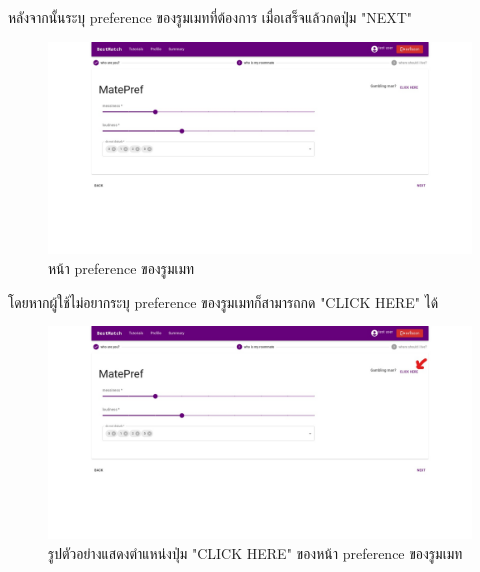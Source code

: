 หลังจากนั้นระบุ preference ของรูมเมทที่ต้องการ เมื่อเสร็จแล้วกดปุ่ม "NEXT"
\begin{figure}[h]
  \begin{center}
    \includegraphics[width=\linewidth]{photo/web/student/mate-def.jpeg}
  \end{center}
  \caption{หน้า preference ของรูมเมท}
\end{figure}
%
\newline
โดยหากผู้ใช้ไม่อยากระบุ preference ของรูมเมทก็สามารถกด "CLICK HERE" ได้
\begin{figure}[h]
  \begin{center}
    \includegraphics[width=\linewidth]{photo/web/student/mate-gambler.jpeg}
  \end{center}
  \caption{รูปตัวอย่างแสดงตำแหน่งปุ่ม "CLICK HERE" ของหน้า preference ของรูมเมท}
\end{figure}
\newpage

